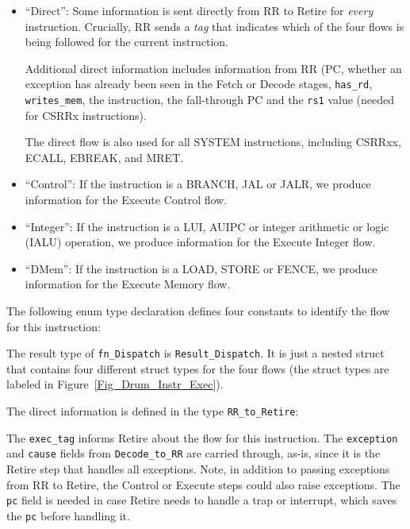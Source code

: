 \begin{itemize}

  \item ``Direct'': Some information is sent directly from RR to
        Retire for \emph{every} instruction.  Crucially, RR sends a
        \emph{tag} that indicates which of the four flows is being
        followed for the current instruction.

        Additional direct information includes information from RR
        (PC, whether an exception has already been seen in the Fetch
        or Decode stages, \verb|has_rd|, \verb|writes_mem|, the
        instruction, the fall-through PC and the \verb|rs1| value
        (needed for CSRRx instructions).

       The direct flow is also used for all SYSTEM instructions,
       including CSRRxx, ECALL, EBREAK, and MRET.

  \item ``Control'': If the instruction is a BRANCH, JAL or JALR, we
        produce information for the Execute Control flow.

  \item ``Integer'': If the instruction is a LUI, AUIPC or integer
        arithmetic or logic (IALU) operation, we produce information
        for the Execute Integer flow.

  \item ``DMem'': If the instruction is a LOAD, STORE or FENCE, we
        produce information for the Execute Memory flow.

\end{itemize}

The following enum type declaration defines four constants to identify
the flow for this instruction:



The result type of \verb|fn_Dispatch| is \verb|Result_Dispatch|.  It
is just a nested struct that contains four different struct types for
the four flows (the struct types are labeled in
Figure~\ref{Fig_Drum_Instr_Exec}).



The direct information is defined in the type \verb|RR_to_Retire|:



The \verb|exec_tag| informs Retire about the flow for this
instruction.  The {\tt exception} and {\tt cause} fields from
\verb|Decode_to_RR| are carried through, as-is, since it is the Retire
step that handles all exceptions.  Note, in addition to passing
exceptions from RR to Retire, the Control or Execute steps could also
raise exceptions.  The {\tt pc} field is needed in case Retire needs
to handle a trap or interrupt, which saves the {\tt pc} before
handling it.

